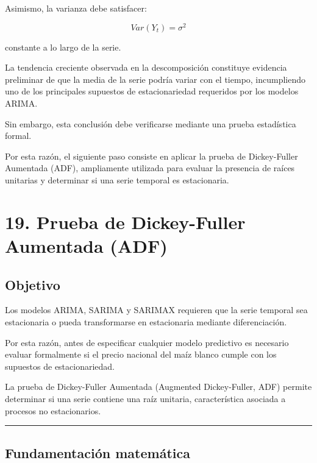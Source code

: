 \documentclass[11pt]{article}
\begin{document}
Asimismo, la varianza debe satisfacer:

\[
Var(Y_t)=\sigma^2
\]

constante a lo largo de la serie.

La tendencia creciente observada en la descomposición constituye
evidencia preliminar de que la media de la serie podría variar con el
tiempo, incumpliendo uno de los principales supuestos de estacionariedad
requeridos por los modelos ARIMA.

Sin embargo, esta conclusión debe verificarse mediante una prueba
estadística formal.

Por esta razón, el siguiente paso consiste en aplicar la prueba de
Dickey-Fuller Aumentada (ADF), ampliamente utilizada para evaluar la
presencia de raíces unitarias y determinar si una serie temporal es
estacionaria.

    \hypertarget{prueba-de-dickey-fuller-aumentada-adf}{%
\section{19. Prueba de Dickey-Fuller Aumentada
(ADF)}\label{prueba-de-dickey-fuller-aumentada-adf}}

\hypertarget{objetivo}{%
\subsection{Objetivo}\label{objetivo}}

Los modelos ARIMA, SARIMA y SARIMAX requieren que la serie temporal sea
estacionaria o pueda transformarse en estacionaria mediante
diferenciación.

Por esta razón, antes de especificar cualquier modelo predictivo es
necesario evaluar formalmente si el precio nacional del maíz blanco
cumple con los supuestos de estacionariedad.

La prueba de Dickey-Fuller Aumentada (Augmented Dickey-Fuller, ADF)
permite determinar si una serie contiene una raíz unitaria,
característica asociada a procesos no estacionarios.

\begin{center}\rule{0.5\linewidth}{0.5pt}\end{center}

\hypertarget{fundamentaciuxf3n-matemuxe1tica}{%
\subsection{Fundamentación
matemática}\label{fundamentaciuxf3n-matemuxe1tica}}
\end{document}
